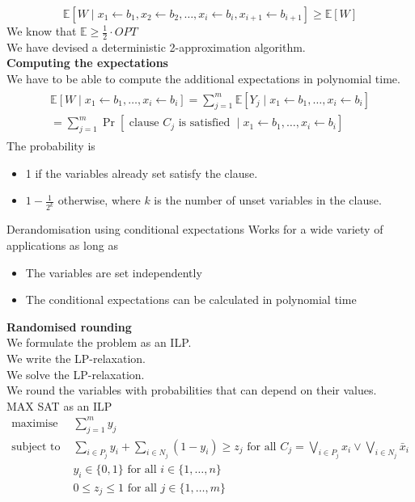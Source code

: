 \documentclass[onecolumn]{report}
\begin{document}
\begin{equation*}
    \mathbb{E}[W \mid x_1 \leftarrow b_1, x_2 \leftarrow b_2, \ldots, x_i \leftarrow b_i, x_{i+1} \leftarrow b_{i+1}] \geq \mathbb{E}[W]
\end{equation*}
We know that $\mathbb{E} \geq \frac{1}{2} \cdot OPT$\\
We have devised a deterministic 2-approximation algorithm.\\
\textbf{Computing the expectations}\\
We have to be able to compute the additional expectations in polynomial time.\\
\begin{align*}
    \begin{gathered}
        \mathbb{E}\left[W \mid x_1 \leftarrow b_1, \ldots, x_i \leftarrow b_i\right]=\sum_{j=1}^m \mathbb{E}\left[Y_j \mid x_1 \leftarrow b_1, \ldots, x_i \leftarrow b_i\right] \\
        =\sum_{j=1}^m \operatorname{Pr}\left[\text { clause } C_j \text { is satisfied } \mid x_1 \leftarrow b_1, \ldots, x_i \leftarrow b_i\right]
        \end{gathered}
\end{align*}
The probability is
\begin{itemize}
    \item 1 if the variables already set satisfy the clause.
    \item $1-\frac{1}{2^k}$ otherwise, where $k$ is the number of unset variables in the clause.
\end{itemize}
Derandomisation using conditional expectations
Works for a wide variety of applications as long as
\begin{itemize}
    \item The variables are set independently
    \item The conditional expectations can be calculated in polynomial time
\end{itemize}
\textbf{Randomised rounding}\\
We formulate the problem as an ILP.\\
We write the LP-relaxation.\\
We solve the LP-relaxation.\\
We round the variables with probabilities that can depend on their values.\\
\noindent
MAX SAT as an ILP
\begin{align*}
    \text{maximise } & \sum_{j=1}^m y_j\\
    \text{subject to } & \sum_{i \in P_j}y_i+\sum_{i \in N_j}(1-y_i) \geq z_j \text{ for all } C_j=\bigvee_{i \in P_j}x_i \vee \bigvee_{i \in N_j}\bar{x}_i\\
    & y_i \in \{0,1\} \text{ for all } i \in \{1, \ldots, n\}\\
    & 0 \leq z_j \leq 1 \text{ for all } j \in \{1, \ldots, m\}
\end{align*}
\end{document}
